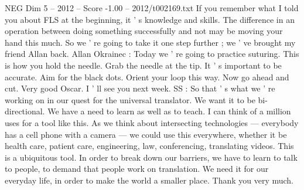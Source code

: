 \begin{textsample}{NEG Dim 5 – 2012 – Score -1.00 – 2012/t002169.txt}
If you remember what I told you about FLS at the beginning, it ' s knowledge and skills.
The difference in an operation between doing something successfully and not may be moving your hand this much.
So we ' re going to take it one step further ; we ' ve brought my friend Allan back.
Allan Okrainec : Today we ' re going to practice suturing.
This is how you hold the needle.
Grab the needle at the tip.
It ' s important to be accurate.
Aim for the black dots.
Orient your loop this way.
Now go ahead and cut.
Very good Oscar.
I ' ll see you next week.
SS : So that ' s what we ' re working on in our quest for the universal translator.
We want it to be bi-directional.
We have a need to learn as well as to teach.
I can think of a million uses for a tool like this.
As we think about intersecting technologies — everybody has a cell phone with a camera — we could use this everywhere, whether it be health care, patient care, engineering, law, conferencing, translating videos.
This is a ubiquitous tool.
In order to break down our barriers, we have to learn to talk to people, to demand that people work on translation.
We need it for our everyday life, in order to make the world a smaller place.
Thank you very much.

\end{textsample}
